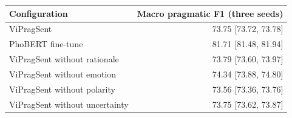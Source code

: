 \small
\begin{tabular}{lr}
\toprule
Configuration & Macro pragmatic F1 (three seeds) \\
\midrule
ViPragSent & 73.75 [73.72, 73.78] \\
PhoBERT fine-tune & 81.71 [81.48, 81.94] \\
ViPragSent without rationale & 73.79 [73.60, 73.97] \\
ViPragSent without emotion & 74.34 [73.88, 74.80] \\
ViPragSent without polarity & 73.56 [73.36, 73.76] \\
ViPragSent without uncertainty & 73.75 [73.62, 73.87] \\
\bottomrule
\end{tabular}%
